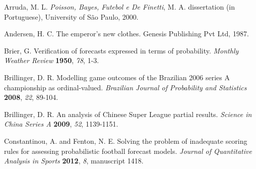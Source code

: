 \documentclass[journal,article,accept,moreauthors,pdftex,12pt,a4paper]{mdpi}
\begin{document}
{    %




    
    \makeatletter
    \renewcommand\@biblabel[1]{#1. }
    \makeatother

    \begin{thebibliography}{999} %




        Arruda, M. L. {\em Poisson, Bayes, Futebol e De Finetti}, M. A. dissertation (in Portuguese), University of S\~ao Paulo, 2000.

        Andersen, H.  C. The emperor's new clothes. Genesis Publishing Pvt Ltd, 1987.

        Brier, G. Verification of forecasts expressed in terms of probability. {\em Monthly Weather Review} {\bf 1950}, {\em 78}, 1-3.

        Brillinger, D. R. Modelling game outcomes of the Brazilian 2006
        series A championship as ordinal-valued. {\em Brazilian Journal of Probability and Statistics} {\bf 2008}, {\em 22}, 89-104.

        Brillinger, D. R. An analysis of Chinese Super League partial
        results. {\em Science in China Series A} {\bf 2009}, {\em 52},
        1139-1151.

        Constantinou, A. and Fenton, N. E. Solving the problem of inadequate scoring rules for assessing probabilistic football forecast models. {\em Journal of Quantitative Analysis in Sports} {\bf 2012}, {\em 8}, manuscript 1418.


\end{thebibliography}}
\end{document}
